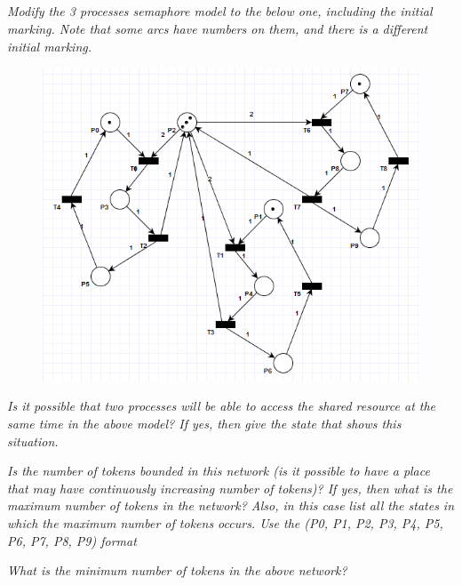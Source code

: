 \documentclass[letterpaper]{article}
\begin{document}
\subsection{}
\textit{Modify the 3 processes semaphore model to the below one, including the initial marking.
 Note that some arcs have numbers on them, and there is a different initial marking.
}

\begin{figure}[H]
 \centering
 \includegraphics[width=\textwidth]{image5.png}
\end{figure}

\textit{Is it possible that two processes will be able to access the shared resource at the same time in the above model? If yes, then give the state that shows this situation.}

\vspace{2cm}
\textit{Is the number of tokens bounded in this network (is it possible to have a place that may have continuously increasing number of tokens)? If yes, then what is the maximum number of tokens in the network? Also, in this case list all the states in which the maximum number of tokens occurs.
 Use the (P0, P1, P2, P3, P4, P5, P6, P7, P8, P9) format
}


\vspace{1cm}
\textit{What is the minimum number of tokens in the above network?}

\section{}
\end{document}
